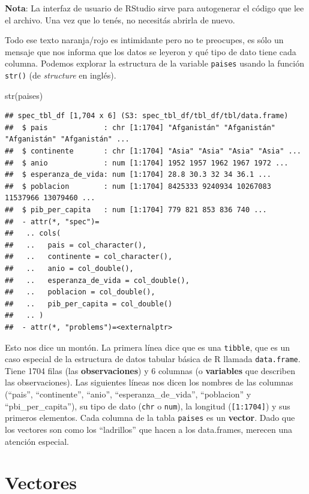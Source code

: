 \documentclass[
  openany]{book}
\newenvironment{Shaded}{\begin{snugshade}}{\end{snugshade}}
\newcommand{\FunctionTok}[1]{\textcolor[rgb]{0.00,0.00,0.00}{#1}}
\newcommand{\NormalTok}[1]{#1}
\begin{document}
\textbf{Nota}: La interfaz de usuario de RStudio sirve para autogenerar el código que lee el archivo.
Una vez que lo tenés, no necesitás abrirla de nuevo.

Todo ese texto naranja/rojo es intimidante pero no te preocupes, es sólo un mensaje que nos informa que los datos se leyeron y qué tipo de dato tiene cada columna.
Podemos explorar la estructura de la variable \texttt{paises} usando la función \texttt{str()} (de \emph{structure} en inglés).

\begin{Shaded}
\begin{Highlighting}[]
\FunctionTok{str}\NormalTok{(paises)}
\end{Highlighting}
\end{Shaded}

\begin{verbatim}
## spec_tbl_df [1,704 x 6] (S3: spec_tbl_df/tbl_df/tbl/data.frame)
##  $ pais             : chr [1:1704] "Afganistán" "Afganistán" "Afganistán" "Afganistán" ...
##  $ continente       : chr [1:1704] "Asia" "Asia" "Asia" "Asia" ...
##  $ anio             : num [1:1704] 1952 1957 1962 1967 1972 ...
##  $ esperanza_de_vida: num [1:1704] 28.8 30.3 32 34 36.1 ...
##  $ poblacion        : num [1:1704] 8425333 9240934 10267083 11537966 13079460 ...
##  $ pib_per_capita   : num [1:1704] 779 821 853 836 740 ...
##  - attr(*, "spec")=
##   .. cols(
##   ..   pais = col_character(),
##   ..   continente = col_character(),
##   ..   anio = col_double(),
##   ..   esperanza_de_vida = col_double(),
##   ..   poblacion = col_double(),
##   ..   pib_per_capita = col_double()
##   .. )
##  - attr(*, "problems")=<externalptr>
\end{verbatim}

Esto nos dice un montón.
La primera línea dice que es una \texttt{tibble}, que es un caso especial de la estructura de datos tabular básica de R llamada \texttt{data.frame}.
Tiene 1704 filas (las \textbf{observaciones}) y 6 columnas (o \textbf{variables} que describen las observaciones).
Las siguientes líneas nos dicen los nombres de las columnas (``pais'', ``continente'', ``anio'', ``esperanza\_de\_vida'', ``poblacion'' y ``pbi\_per\_capita''), su tipo de dato (\texttt{chr} o \texttt{num}), la longitud (\texttt{{[}1:1704{]}}) y sus primeros elementos.
Cada columna de la tabla \texttt{paises} es un \textbf{vector}.
Dado que los vectores son como los ``ladrillos'' que hacen a los data.frames, merecen una atención especial.

\hypertarget{vectores}{%
\section{Vectores}\label{vectores}}
\end{document}
